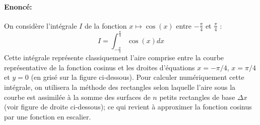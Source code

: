 \documentclass[11pt,a4paper,colorlinks,breaklinks]{article}
\begin{document}
\begin{framed}
\paragraph{Enoncé:} On considère l'intégrale $I$ de la 
fonction $x \mapsto \cos(x)$ entre $\displaystyle -\frac{\pi}{4}$ et 
$\displaystyle\frac{\pi}{4}$ :
$$ I = \int_{-\frac{\pi}{4}}^{\frac{\pi}{4}} \cos(x)dx$$ 
Cette intégrale représente classiquement l'aire comprise entre 
la courbe représentative de la fonction cosinus et les droites d'équations 
$x=-\pi/4$, $x=\pi/4$ et $y=0$ (en grisé sur la figure ci-dessous). 
Pour calculer numériquement cette intégrale, on utilisera la méthode des rectangles
selon laquelle l'aire sous la courbe est assimilée à la somme des surfaces de $n$ petits 
rectangles de base $\Delta x$ (voir figure de droite ci-dessous); ce qui revient à 
approximer la fonction cosinus par une fonction en escalier.


\end{framed}
\end{document}
